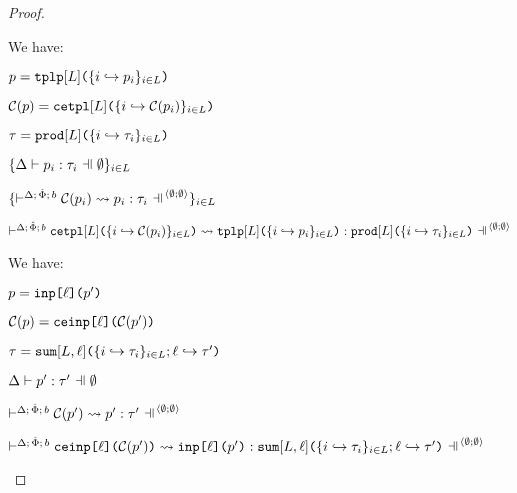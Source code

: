 {{{{\begin{proof}
\begin{byCases}
\begin{pfsteps*}
  \end{pfsteps*}
  \resetpfcounter
\item[\text{(\ref{rule:patType-tpl})}] We have:
  \begin{pfsteps*}
    \item $p=\texttt{tplp}[L]\texttt{(}\{i \hookrightarrow p_{i}\}_{i \in L}\texttt{)}$ 
    \item $\mathcal{C}(p)=\texttt{cetpl}[L]\texttt{(}\{i \hookrightarrow \mathcal{C}(p_{i})\}_{i \in L}\texttt{)}$ 
    \item $\tau=\texttt{prod}[L]\texttt{(}\{i \hookrightarrow \tau_{i}\}_{i \in L}\texttt{)}$ 
    \item $\{\patType{\emptyset}{p_i}{\tau_i}\}_{i \in \labelset}$  
    \item $\{\cvalidP{\uGG{\emptyset}{\emptyset}}{\pscene{\Delta}{\uPhi}{b}}{\Cof{p_i}}{p_i}{\tau_i}\}_{i \in \labelset}$  
    \item $\cvalidP{\uGG{\emptyset}{\emptyset}}{\pscene{\Delta}{\uPhi}{b}}{\acetpl{\labelset}{\mapschemax{\Cofv}{p}{i}{\labelset}}}{\aetplp{\labelset}{\mapschema{p}{i}{\labelset}}}{\aprod{\labelset}{\mapschema{\tau}{i}{\labelset}}}$ 
  \end{pfsteps*}
  \resetpfcounter
\item[\text{(\ref{rule:patType-inj})}] We have:
  \begin{pfsteps*}
    \item $p=\texttt{inp}\texttt{[}\ell\texttt{](}p'\texttt{)}$ 
    \item $\mathcal{C}(p)=\texttt{ceinp}\texttt{[}\ell\texttt{](}\mathcal{C}(p')\texttt{)}$ 
    \item $\tau=\texttt{sum}[L, \ell]\texttt{(}\{i \hookrightarrow \tau_{i}\}_{i \in L}; \ell \hookrightarrow \tau'\texttt{)}$ 
    \item $\patType{\emptyset}{p'}{\tau'}$ 
    \item $\cvalidP{\uGG{\emptyset}{\emptyset}}{\pscene{\Delta}{\uPhi}{b}}{\Cof{p'}}{p'}{\tau'}$ 
    \item $\cvalidP{\uGG{\emptyset}{\emptyset}}{\pscene{\Delta}{\uPhi}{b}}{\aceinjp{\ell}{\Cof{p'}}}{\aeinjp{\ell}{p'}}{\asum{\labelset, \ell}{\mapschema{\tau}{i}{\labelset}; \mapitem{\ell}{\tau'}}}$ 
  \end{pfsteps*}
  \resetpfcounter
\end{byCases}
\end{proof}

}}}}
